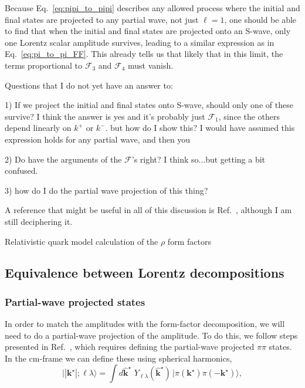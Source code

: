 Because Eq.~\ref{eq:pipi_to_pipi} describes any allowed process where the initial and final states are projected to any partial wave, not just $\ell=1$, one should be able to find that when the initial and final states are projected onto an S-wave, only one Lorentz scalar amplitude survives, leading to a similar expression as in Eq.~\ref{eq:pi_to_pi_FF}.  This already tells us that likely that in this limit, the terms proportional to $\mathcal{F}_{3}$ and $\mathcal{F}_{4}$ must vanish.




{\raul 
Questions that I do not yet have an answer to:

	1) If we project the initial and final states onto S-wave, should only one of these survive? I think the answer is yes and it's probably just $\mathcal{F}_1$, since the others depend linearly on $k^+$ or $k^-$. but how do I show this? I would have assumed this expression holds for any partial wave, and then you 
	
	2) Do have the arguments of the $\mathcal{F}$'s right? I think so...but getting a bit confused. 
	
	3) how do I do the partial wave projection of this thing? 
}

{\raul A reference that might be useful in all of this discussion is Ref.~\cite{Krutov:2004vc}, although I am still deciphering it.}

{\raul Relativistic quark model calculation of the $\rho$ form factors ~\cite{Krutov:2004qx}}


 \subsection{Equivalence between Lorentz decompositions \label{sec:equivalence}}
 
 \subsubsection{Partial-wave projected states}
In order to match the amplitudes with the form-factor decomposition, we will need to do a partial-wave projection of the amplitude. To do this, we follow steps presented in Ref.~\cite{Briceno:2016kkp}, which requires defining the partial-wave projected $\pi\pi$ states. In the cm-frame we can define these using spherical harmonics,
\begin{equation}
\big| |\textbf{k}^\star|; \ell \lambda \big\rangle = \int \! d\hat{\mathbf{k}}^\star \, \,{Y_{\ell \lambda}(\hat{\mathbf{k}}^\star)}\, \big| \pi(\textbf{k}^\star) \pi(-\textbf{k}^\star)\big\rangle,
\end{equation}

